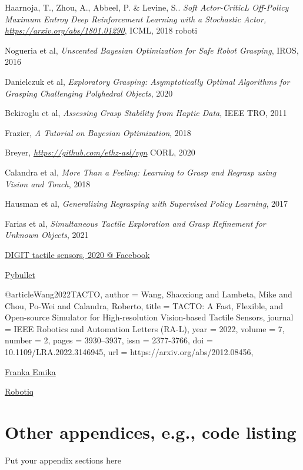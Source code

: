 \documentclass[12pt, a4paper]{report}
\theoremstyle{definition}
\begin{document}
\begin{thebibliography}{9}
    Haarnoja, T., Zhou, A., Abbeel, P. & Levine, S..
    \textit{Soft Actor-CriticL Off-Policy Maximum Entroy Deep Reinforcement Learning with a Stochastic Actor, \href{https://arxiv.org/abs/1801.01290}{https://arxiv.org/abs/1801.01290}},
    ICML,
    2018 roboti

    Nogueria et al,
    \textit{Unscented Bayesian Optimization for Safe Robot Grasping},
    IROS,
    2016

    Danielczuk et al,
    \textit{Exploratory Grasping: Asymptotically Optimal Algorithms for Grasping Challenging Polyhedral Objects},
    2020

    Bekiroglu et al,
    \textit{Assessing Grasp Stability from Haptic Data},
    IEEE TRO,
    2011

    Frazier,
    \textit{A Tutorial on Bayesian Optimization},
    2018

    Breyer,
    \textit{\href{https://github.com/ethz-asl/vgn}{https://github.com/ethz-asl/vgn}}
    CORL,
    2020

    Calandra et al,
    \textit{More Than a Feeling: Learning to Grasp and Regrasp using Vision and Touch},
    2018

    Hausman et al,
    \textit{Generalizing Regrasping with Supervised Policy Learning},
    2017

    Farias et al,
    \textit{Simultaneous Tactile Exploration and Grasp Refinement for Unknown Objects},
    2021

    \href{https://digit.ml/}{DIGIT tactile sensors, 2020 @ Facebook}

    \href{https://pybullet.org/wordpress/}{Pybullet}

@article{Wang2022TACTO,
  author   = {Wang, Shaoxiong and Lambeta, Mike and Chou, Po-Wei and Calandra, Roberto},
  title    = {{TACTO}: A Fast, Flexible, and Open-source Simulator for High-resolution Vision-based Tactile Sensors},
  journal  = {IEEE Robotics and Automation Letters (RA-L)},
  year     = {2022},
  volume   = {7},
  number   = {2},
  pages    = {3930--3937},
  issn     = {2377-3766},
  doi      = {10.1109/LRA.2022.3146945},
  url      = {https://arxiv.org/abs/2012.08456},
}

    \href{https://www.franka.de}{Franka Emika}

    \href{https://robotiq.com/products/2f85-140-adaptive-robot-gripper}{Robotiq}

\end{thebibliography}

\chapter{Other appendices, e.g., code listing}
Put your appendix sections here
\end{document}
